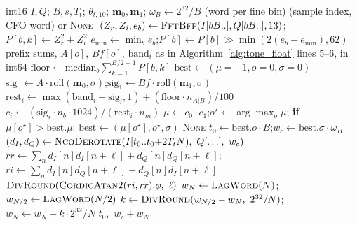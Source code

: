 \begin{algorithm}[H]
\caption{Integer tone detector, frame at once (\texttt{FixedReceiver.\_detect\_newman}; \texttt{rx\_detect.c}).}
\label{alg:tone_int}
\begin{algorithmic}[1]
\Require int16 $I, Q$; $B, s, T_t$; $\theta_{t,10}$; $\mathbf{m}_0, \mathbf{m}_1$; $\omega_B \gets 2^{32}/B$ (word per fine bin)
\Ensure (sample index, CFO word) or \textsc{None}
 $\ (Z_r, Z_i, e_b) \gets \textsc{FftBfp}(I[bB..], Q[bB..], 13)$;\quad $P[b,k] \gets Z_r^2 + Z_i^2$ \EndFor
\State $e_{\min} \gets \min_b e_b$;\quad $P[b] \gets P[b] \gg \min(2(e_b - e_{\min}), 62)$ 
\State prefix sums, $A[o]$, $Bf[o]$, $\mathrm{band}_i$ as in Algorithm~\ref{alg:tone_float} lines 5--6, in int64
\State $\mathrm{floor} \gets \mathrm{median}_b \sum_{k=1}^{B/2-1} P[b,k]$ 
\State $\mathrm{best} \gets (\mu{=}-1, o{=}0, \sigma{=}0)$
 
    \State $\mathrm{sig}_0 \gets A \cdot \mathrm{roll}(\mathbf{m}_0, \sigma)$;\quad $\mathrm{sig}_1 \gets Bf \cdot \mathrm{roll}(\mathbf{m}_1, \sigma)$ 
    \State $\mathrm{rest}_i \gets \max(\mathrm{band}_i - \mathrm{sig}_i, 1) + (\mathrm{floor} \cdot n_{A|B}) / 100$
    \State $c_i \gets (\mathrm{sig}_i \cdot n_b \cdot 1024) / (\mathrm{rest}_i \cdot n_m)$ 
    \State $\mu \gets c_0 \cdot c_1$;\quad $o^\star \gets \arg\max_o \mu$; \textbf{if} $\mu[o^\star] > \mathrm{best}.\mu$: $\mathrm{best} \gets (\mu[o^\star], o^\star, \sigma)$ 
\EndFor
{} \Return \textsc{None} \EndIf
\State $t_0 \gets \mathrm{best}.o \cdot B$;\quad $w_c \gets \mathrm{best}.\sigma \cdot \omega_B$ 
\State $(d_I, d_Q) \gets \textsc{NcoDerotate}(I[t_0 .. t_0{+}2T_tN),\ Q[\ldots],\ w_c)$ 
 
    \State $rr \gets \sum_n d_I[n] d_I[n{+}\ell] + d_Q[n] d_Q[n{+}\ell]$;\quad $ri \gets \sum_n d_I[n] d_Q[n{+}\ell] - d_Q[n] d_I[n{+}\ell]$
    \State \Return $\textsc{DivRound}(\textsc{CordicAtan2}(ri, rr).\phi,\ \ell)$
\EndFunction
\State $w_N \gets \textsc{LagWord}(N)$;\quad $w_{N/2} \gets \textsc{LagWord}(N/2)$ 
\State $k \gets \textsc{DivRound}(w_{N/2} - w_N,\ 2^{32}/N)$;\quad $w_N \gets w_N + k \cdot 2^{32}/N$ 
\State \Return $t_0$,\ $w_c + w_N$
\end{algorithmic}
\end{algorithm}

